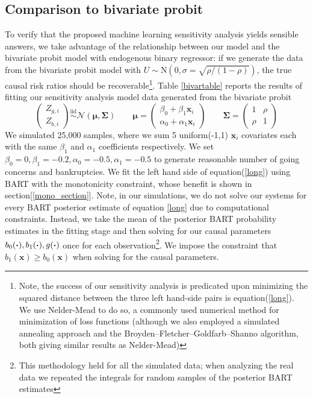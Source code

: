 \documentclass[aoas,preprint, 11pt, dvipsnames, table, x11name]{imsart}
\renewcommand{\bm}[1]{\mathbf{#1}}
\theoremstyle{remark}
\begin{document}
\subsection{Comparison to bivariate probit}\label{bivar_simsec} To verify that the proposed machine learning sensitivity analysis yields sensible answers, we take advantage of the relationship between our model and the bivariate probit model with endogenous binary regressor: if we generate the data from the bivariate probit model with $U \sim \mbox{N}(0, \sigma=\sqrt{\rho/(1-\rho)})$, the true causal risk ratios should be recoverable\footnote{Note, the success of our sensitivity analysis is predicated upon  minimizing the squared distance between the three left hand-side pairs is equation(\ref{long}). We use Nelder-Mead to do so, a commonly used numerical method for minimization of loss functions \citep{nelder} (although we also employed a simulated annealing approach and the Broyden–Fletcher–Goldfarb–Shanno algorithm, both giving similar results as Nelder-Mead)}.  Table \ref{bivartable} reports the results of fitting our sensitivity analysis model data generated from the bivariate probit
\[
\begin{pmatrix}
	Z_{g,i}\\
	Z_{b,i}
\end{pmatrix}\stackrel{\text{iid}}{\sim}\mathcal{N}(\bm{\mu}, \bm{\Sigma})
\qquad \bm{\mu}=\begin{pmatrix}
	\beta_0+\beta_1\bm{x}_i\\
	\alpha_0+\alpha_1\bm{x}_i
\end{pmatrix}
\qquad
\bm{\Sigma}=\begin{pmatrix}
	1&\rho\\
	\rho&1
\end{pmatrix}
\label{model3}
\]
We simulated 25,000 samples, where we sum 5 uniform(-1,1) $\bm{x}_i$ covariates each with the same $\beta_1$ and $\alpha_1$ coefficients respectively.  We set $\beta_0=0, \beta_1=-0.2, \alpha_0=-0.5, \alpha_1=-0.5$ to generate reasonable number of going concerns and bankruptcies.  We fit the left hand side of equation(\ref{long}) using BART with the monotonicity constraint, whose benefit is shown in section[\ref{mono_section}].  Note, in our simulations, we do not solve our systems for every BART posterior estimate of equation \ref{long} due to computational constraints.  Instead, we take the mean of the posterior BART probability estimates in the fitting stage and then solving for our causal parameters $b_0(\vdot), b_1(\vdot), g(\vdot)$ once for each observation\footnote{This methodology held for all the simulated data; when analyzing the real data we repeated the integrals for random samples of the posterior BART estimates}.  We impose the constraint that $b_1(\bm{x})\geq b_0(\bm{x})$ when solving for the causal parameters.
\end{document}
